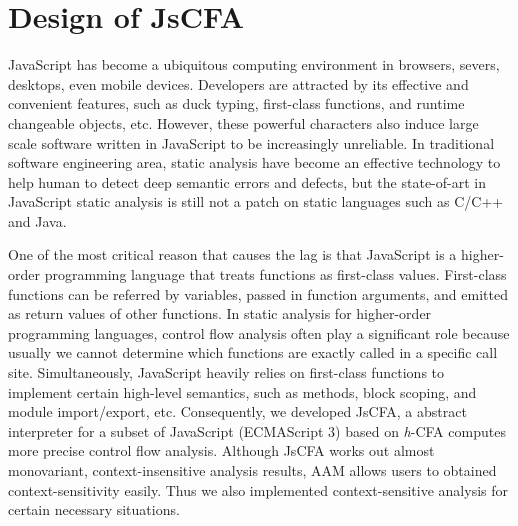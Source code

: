 \documentclass{article}
\begin{document}

\section{Design of JsCFA}
\label{sec:JsCFA}
JavaScript has become a ubiquitous computing environment in browsers, severs, desktops, even mobile devices. Developers are attracted by its effective and convenient features, such as duck typing, first-class functions, and runtime changeable objects, etc. However, these powerful characters also induce large scale software written in JavaScript to be increasingly unreliable.
In traditional software engineering area, static analysis have become an effective technology to help human to detect deep semantic errors and defects, but the state-of-art in JavaScript static analysis is still not a patch on static languages such as C/C++ and Java.

One of the most critical reason that causes the lag is that JavaScript is a higher-order programming language that treats functions as first-class values. First-class functions can be referred by variables, passed in function arguments, and emitted as return values of other  functions.
In static analysis for higher-order programming languages, control flow analysis often play a significant role because usually we cannot determine which functions are exactly called in a specific call site.
Simultaneously, JavaScript heavily relies on first-class functions to implement certain high-level semantics, such as methods, block scoping, and module import/export, etc.
Consequently, we developed JsCFA, a abstract interpreter for a subset of JavaScript (ECMAScript 3) based on \textit{h}-CFA computes more precise control flow analysis.
Although JsCFA works out almost monovariant, context-insensitive analysis results, AAM allows users to obtained context-sensitivity easily.
Thus we also implemented context-sensitive analysis for certain necessary situations.
\end{document}
